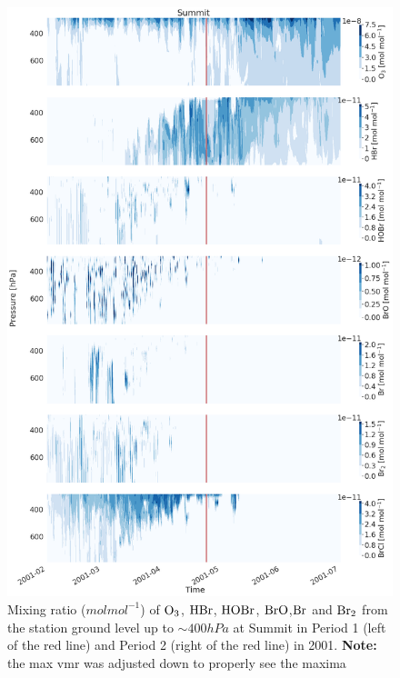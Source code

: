 \begin{figure}[h]
    \centering
    \includegraphics[width=0.8\linewidth]{Chapter6_Results/images/Vert_StationComp_2001/vert_all_species_SUM.png}
    \caption{Mixing ratio ($mol mol^{-1}$) of $\mathrm{O_3}$, $\mathrm{HBr}$, $\mathrm{HOBr}$, $\mathrm{BrO}$,$\mathrm{Br}$ and $\mathrm{Br_2}$ from the station ground level up to $\sim 400 hPa$ at Summit in Period 1 (left of the red line) and Period 2 (right of the red line) in 2001. \textbf{Note:} the max  vmr was adjusted down to properly see the maxima}
    \label{fig:vert_SUM}
\end{figure}
